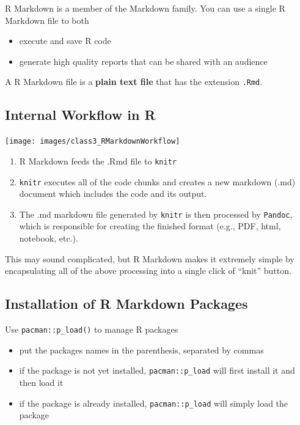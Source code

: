 \documentclass[
  11pt,
]{book}
\providecommand{\tightlist}{%
  \setlength{\itemsep}{0pt}\setlength{\parskip}{0pt}}
\begin{document}
R Markdown is a member of the Markdown family. You can use a single R Markdown file to both

\begin{itemize}
\tightlist
\item
  execute and save R code
\item
  generate high quality reports that can be shared with an audience
\end{itemize}

A R Markdown file is a \textbf{plain text file} that has the extension \texttt{.Rmd}.

\hypertarget{internal-workflow-in-r}{%
\subsection{Internal Workflow in R}\label{internal-workflow-in-r}}

\begin{center}\texttt{[image: images/class3\_RMarkdownWorkflow]} \end{center}

\begin{enumerate}
\def\labelenumi{\arabic{enumi}.}
\tightlist
\item
  R Markdown feeds the .Rmd file to \texttt{knitr}
\item
  \texttt{knitr} executes all of the code chunks and creates a new markdown (.md) document which includes the code and its output.
\item
  The .md markdown file generated by \texttt{knitr} is then processed by \texttt{Pandoc}, which is responsible for creating the finished format (e.g., PDF, html, notebook, etc.).
\end{enumerate}

This may sound complicated, but R Markdown makes it extremely simple by encapsulating all of the above processing into a single click of ``knit'' button.

\hypertarget{installation-of-r-markdown-packages}{%
\subsection{Installation of R Markdown Packages}\label{installation-of-r-markdown-packages}}

\small

Use \texttt{pacman::p\_load()} to manage R packages

\begin{itemize}
\tightlist
\item
  put the packages names in the parenthesis, separated by commas
\item
  if the package is not yet installed, \texttt{pacman::p\_load} will first install it and then load it
\item
  if the package is already installed, \texttt{pacman::p\_load} will simply load the package
\end{itemize}
\end{document}
